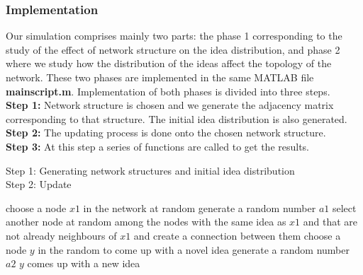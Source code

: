 \documentclass{beamer}
\begin{document}
\begin{frame}
\frametitle{Implementation}
Our simulation comprises mainly two parts: the phase 1 corresponding to the study  of the effect of network structure on the idea distribution, and phase 2 where we study how the distribution of the ideas affect the topology of the network. These two phases are implemented in the same MATLAB file \textbf{mainscript.m}. Implementation of both phases is divided into three steps. 
\\

\noindent \textbf{Step 1:} Network structure is chosen and we generate the adjacency matrix corresponding to that structure. The initial idea distribution is also generated.\\
\textbf{Step 2:} The updating process is done onto the chosen network structure.\\
\textbf{Step 3:} At this step a series of functions are called to get the results.
\end{frame}
%
\begin{frame}
{Step 1: Generating network structures and initial idea distribution}\\
{Step 2: Update}\\
\begin{algorithm}                      %
\caption{Update process}          %
\label{alg1}                           %
\begin{algorithmic}                    %
    	\State choose a node $x1$ in the network at random
	\State generate a random number $a1$
     
        \State select another node at random among the nodes with the same idea as $x1$ and that are not already neighbours of $x1$ and create a connection between them
            \EndIf
    \State choose a node $y$ in the random to come up with a novel idea
    \State generate a random number $a2$
     $y$ comes up with a new idea 
     \EndIf
   \EndFor
\end{algorithmic}
\end{algorithm}
\end{frame}
\end{document}

